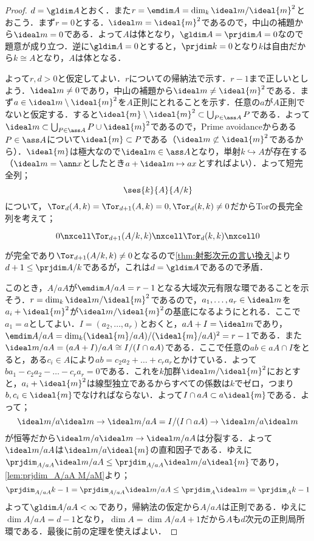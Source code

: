 \begin{proof}
	$d=\gldim A$とおく．また$r=\emdim A=\dim_k\ideal m/\ideal{m}^2$とおこう．まず$r=0$とする．$\ideal m=\ideal{m}^2$であるので，中山の補題から$\ideal m=0$である．よって$A$は体となり，$\gldim A=\prjdim A=0$なので題意が成り立つ．逆に$\gldim A=0$とすると，$\prjdim k=0$となり$k$は自由だから$k\cong A$となり，$A$は体となる．
	
	よって$r,d>0$と仮定してよい．$r$についての帰納法で示す．$r-1$まで正しいとしよう．$\ideal m\neq0$であり，中山の補題から$\ideal m\neq\ideal{m}^2$である．まず$a\in\ideal m\setminus\ideal{m}^2$を$A$正則にとれることを示す．任意の$a$が$A$正則でないと仮定する．すると$\ideal{m}\setminus\ideal{m}^2\subset\bigcup_{P\in\ass A}P$である．よって$\ideal m\subset\bigcup_{P\in\ass A}P\cup\ideal{m}^2$であるので，Prime avoidanceからある$P\in\ass A$について$\ideal{m}\subset P$である（$\ideal m\not\subset\ideal{m}^2$であるから）．$\ideal{m}$は極大なので$\ideal m\in\ass A$となり，単射$k\hookrightarrow A$が存在する（$\ideal m=\ann x$としたとき$a+\ideal m\mapsto ax$とすればよい）．よって短完全列；
	\[\ses{k}{A}{A/k}\]
	について，$\Tor_d(A,k)=\Tor_{d+1}(A,k)=0,\Tor_d(k,k)\neq0$だからTorの長完全列を考えて；
	\[\begin{tikzcd}
		0\nxcell\Tor_{d+1}(A/k,k)\nxcell\Tor_d(k,k)\nxcell0
	\end{tikzcd}\]
	が完全であり$\Tor_{d+1}(A/k,k)\neq0$となるので\ref{thm:射影次元の言い換え}より$d+1\leq\prjdim A/k$であるが，これは$d=\gldim A$であるので矛盾．
	
	このとき，$A/aA$が$\emdim A/aA=r-1$となる大域次元有限な環であることを示そう．$r=\dim_k \ideal m/\ideal{m}^2$であるので，$a_1,\dots,a_r\in\ideal m$を$a_i+\ideal{m}^2$が$\ideal m/\ideal{m}^2$の基底になるようにとれる．ここで$a_1=a$としてよい．$I=(a_2,\dots,a_r)$とおくと，$aA+I=\ideal m$であり，$\emdim A/aA=\dim_k (\ideal{m}/aA)/(\ideal{m}/aA)^2=r-1$である．また$\ideal m/aA=(aA+I)/aA\cong I/(I\cap aA)$である．ここで任意の$ab\in aA\cap I$をとると，ある$c_i\in A$により$ab=c_2a_2+\dots+c_ra_r$とかけている．よって$ba_1-c_2a_2-\dots-c_ra_r=0$である．これを$k$加群$\ideal m/\ideal{m}^2$におとすと，$a_i+\ideal{m}^2$は線型独立であるからすべての係数は$k$でゼロ，つまり$b,c_i\in\ideal{m}$でなければならない．よって$I\cap aA\subset a\ideal{m}$である．よって；
	\[\ideal m/a\ideal m\to\ideal m/aA=I/(I\cap aA)\to\ideal m/a\ideal m\]
	が恒等だから$\ideal m/a\ideal m\to \ideal m/aA$は分裂する．よって$\ideal m/aA$は$\ideal m/a\ideal{m}$の直和因子である．ゆえに$\prjdim_{A/aA}\ideal m/aA\leq\prjdim_{A/aA}\ideal m/a\ideal{m}$であり，\ref{lem:prjdim_A/aA M/aM}より；
	\[\prjdim_{A/aA} k-1=\prjdim_{A/aA}\ideal m/aA\leq\prjdim_A \ideal m=\prjdim_A k-1\]
	よって$\gldim A/aA<\infty$であり，帰納法の仮定から$A/aA$は正則である．ゆえに$\dim A/aA=d-1$となり，$\dim A=\dim A/aA+1$だから$A$も$d$次元の正則局所環である．最後に前の定理を使えばよい．
\end{proof}

